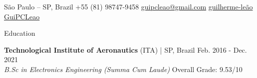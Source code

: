 \documentclass{resume} %
\begin{document}
\vspace{-0.7cm}
\begin{center}
\faHome
    \hspace{0.1cm}
        São Paulo -- SP, Brazil
    \hspace{0.05cm}  \hspace{0.05cm}
\faMobile
    \hspace{0.1cm}
        +55 (81) 98747-9458
    \hspace{0.05cm}  \hspace{0.05cm}
\faEnvelope
    \hspace{0.1cm}
	\href{mailto:guipcleao@gmail.com}{guipcleao@gmail.com}
    \hspace{0.05cm}  \hspace{0.05cm}
\faLinkedinSquare
    \hspace{0.1cm}
        \href{https://www.linkedin.com/in/guilherme-le\%C3\%A3o}{guilherme-le\~{a}o}
    \hspace{0.05cm}  \hspace{0.05cm}
	\href{https://github.com/GuiPCLeao}{GuiPCLeao}
\end{center}


\vspace{-0.1cm}

\begin{rSection}{Education}

{\bf Technological Institute of Aeronautics} (ITA) | SP, Brazil \hfill Feb. 2016 - Dec. 2021
\\ {\em B.Sc in Electronics Engineering (Summa Cum Laude)} \hfill { Overall Grade: 9.53/10}


\end{rSection}
\end{document}
